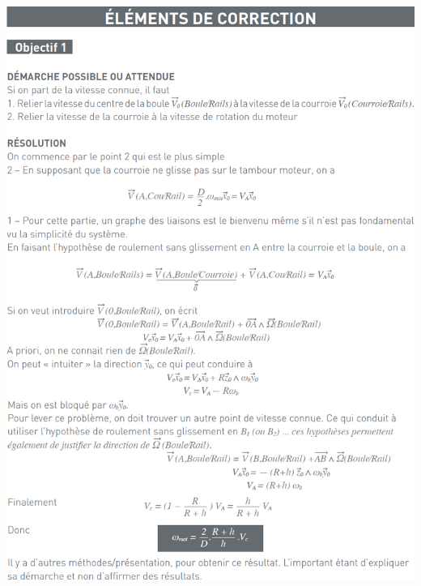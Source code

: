 \documentclass[10pt,fleqn]{article} %
\begin{document}
\fi




\begin{center}
\includegraphics[width=\linewidth]{images/cor_01}
\end{center}
\end{document}

